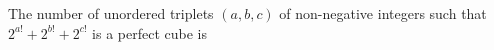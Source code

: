 The number of unordered triplets $(a,b,c)$ of non-negative integers such that $2^{a!} + 2^{b!} + 2^{c!}$ is a perfect cube is

